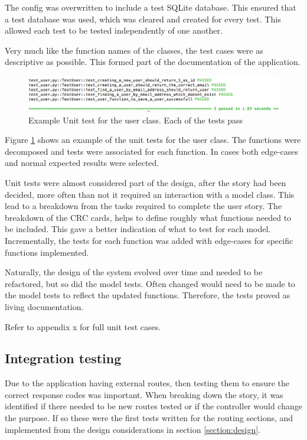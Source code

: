 The config was overwritten to include a test SQLite database. This ensured that a test database was used, which was cleared and created for every test. This allowed each test to be tested independently of one another.

Very much like the function names of the classes, the test cases were as descriptive as possible. This formed part of the documentation of the application.

\begin{figure}[h!]
  \centering
  \includegraphics[width=\textwidth]{images/unit_test_user}
  \caption{Example Unit test for the user class. Each of the tests pass}
  \label{fig:unit_user}
\end{figure}

Figure \ref{fig:unit_user} shows an example of the unit tests for the user class. The functions were decomposed and tests were associated for each function. In cases both edge-cases and normal expected results were selected.

Unit tests were almost considered part of the design, after the story had been decided, more often than not it required an interaction with a model class. This lead to a breakdown from the tasks required to complete the user story. The breakdown of the CRC cards, helps to define roughly what functions needed to be included. This gave a better indication of what to test for each model. Incrementally, the tests for each function was added with edge-cases for specific functions implemented.

Naturally, the design of the system evolved over time and needed to be refactored, but so did the model tests. Often changed would need to be made to the model tests to reflect the updated functions. Therefore, the tests proved as living documentation.

Refer to appendix x for full unit test cases.

\subsection{Integration testing}
Due to the application having external routes, then testing them to ensure the correct response codes was important. When breaking down the story, it was identified if there needed to be new routes tested or if the controller would change the purpose. If so these were the first tests written for the routing sections, and implemented from the design considerations in section \ref{section:design}.


